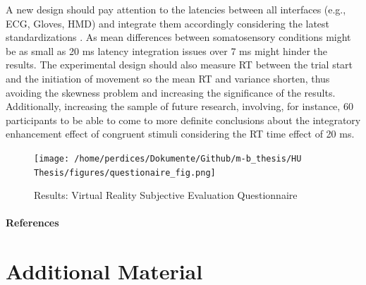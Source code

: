 \documentclass[12pt,oneside,openright]{report}
\begin{document}
A new design should pay attention to the latencies between all interfaces (e.g., ECG, Gloves, HMD) and integrate them accordingly considering the latest standardizations \parencite{vr_respont}. As mean differences between somatosensory conditions might be as small as 20 ms latency integration issues over 7 ms might hinder the results. The experimental design should also measure RT between the trial start and the initiation of movement so the mean RT and variance shorten, thus avoiding the skewness problem and increasing the significance of the results. Additionally, increasing the sample of future research, involving, for instance, 60 participants to be able to come to more definite conclusions about the integratory enhancement effect of congruent stimuli considering the RT time effect of 20 ms.

\newpage
\begin{figure}[ht]
        \centering
        \texttt{[image: /home/perdices/Dokumente/Github/m-b\_thesis/HU Thesis/figures/questionaire\_fig.png]}
        \caption{Results: Virtual Reality Subjective Evaluation Questionnaire}
        \label{fig:quest}
\end{figure}
\pagebreak



\paragraph{\textbf{References}}
\printbibliography[heading=none]


\pagebreak
\vspace*{\fill}
\section*{\centering Additional Material}
\vspace*{\fill}
\end{document}
